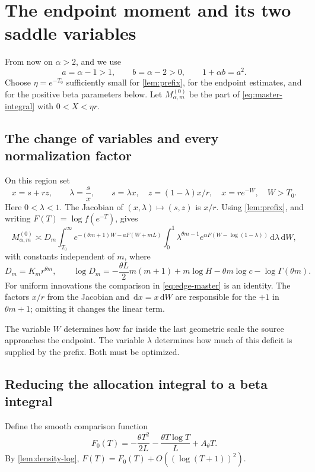 \documentclass[11pt,a4paper]{article}
\numberwithin{equation}{section}
\theoremstyle{definition}\newaliascnt{definition}{theorem}
\theoremstyle{remark}\newaliascnt{remark}{theorem}
\newcommand{\dd}{\,\mathrm d}
\newcommand{\asympc}{\asymp}
\begin{document}
\section{The endpoint moment and its two saddle variables}
\label{sec:saddle}
From now on $\alpha>2$, and we use
\begin{equation}
 a=\alpha-1>1,\qquad b=\alpha-2>0,
 \qquad 1+\alpha b=a^2.
 \label{eq:ab}
\end{equation}
Choose $\eta=e^{-T_0}$ sufficiently small for \cref{lem:prefix}, for the
endpoint estimates, and for the positive beta parameters below. Let
$M_{\alpha,m}^{(0)}$ be the part of \eqref{eq:master-integral} with
$0<X<\eta r$.

\subsection{The change of variables and every normalization factor}
On this region set
\begin{equation}
 x=s+rz,\qquad \lambda=\frac{s}{x},\qquad
 s=\lambda x,\quad z=(1-\lambda)x/r,
 \quad x=r e^{-W},\quad W>T_0.
 \label{eq:edge-coordinates}
\end{equation}
Here $0<\lambda<1$. The Jacobian of $(x,\lambda)\mapsto(s,z)$ is $x/r$.
Using \cref{lem:prefix}, and writing $F(T)=\log f(e^{-T})$, gives
\begin{equation}
 M_{\alpha,m}^{(0)}\asympc
 D_m\int_{T_0}^\infty e^{-(\theta m+1)W-aF(W+mL)}
 \int_0^1\lambda^{\theta m-1}
       e^{\alpha F(W-\log(1-\lambda))}\dd\lambda\dd W,
 \label{eq:edge-master}
\end{equation}
with constants independent of $m$, where
\begin{equation}
 D_m=K_m r^{\theta m},\qquad
 \log D_m=-\frac{\theta L}{2}m(m+1)+m\log H
             -\theta m\log c-\log\Gamma(\theta m).
 \label{eq:Dm}
\end{equation}
For uniform innovations the comparison in \eqref{eq:edge-master} is an
identity. The factors $x/r$ from the Jacobian and $\dd x=x\dd W$ are
responsible for the $+1$ in $\theta m+1$; omitting it changes the linear term.

The variable $W$ determines how far inside the last geometric scale the
source approaches the endpoint. The variable $\lambda$ determines how much
of this deficit is supplied by the prefix. Both must be optimized.

\subsection{Reducing the allocation integral to a beta integral}
Define the smooth comparison function
\begin{equation}
 F_0(T)=-\frac{\theta T^2}{2L}-\frac{\theta T\log T}{L}+A_\theta T.
 \label{eq:F0}
\end{equation}
By \cref{lem:density-log}, $F(T)=F_0(T)+O((\log(T+1))^2)$.
\end{document}
